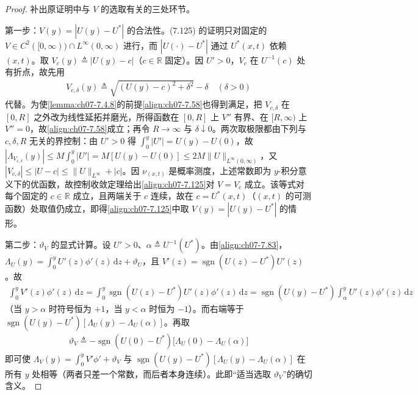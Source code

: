 \documentclass[../../main.tex]{subfiles}%
\begin{document}
\begin{proof}
补出原证明中与 $V$ 的选取有关的三处环节。

第一步：$V(y)=|U(y)-U^*|$ 的合法性。(7.125) 的证明只对固定的 $V\in C^2([0,\infty))\cap L^\infty(0,\infty)$ 进行，而 $|U(\cdot)-U^*|$ 通过 $U^*(x,t)$ 依赖 $(x,t)$。取 $V_c(y)\triangleq|U(y)-c|$（$c\in\mathbb{R}$ 固定）。因 $U'>0$，$V_c$ 在 $U^{-1}(c)$ 处有折点，故先用
\begin{align*}
V_{c,\delta}(y)\triangleq\sqrt{(U(y)-c)^2+\delta^2}-\delta\quad(\delta>0)
\end{align*}
代替。为使\cref{lemma:ch07-7.4.8}的前提\eqref{align:ch07-7.58}也得到满足，把 $V_{c,\delta}$ 在 $[0,R]$ 之外改为线性延拓并磨光，所得函数在 $[0,R]$ 上 $V''$ 有界、在 $[R,\infty)$ 上 $V''=0$，故\eqref{align:ch07-7.58}成立；再令 $R\to\infty$ 与 $\delta\downarrow0$。两次取极限都由下列与 $c,\delta,R$ 无关的界控制：由 $U'>0$ 得 $\int_0^y|U'|=U(y)-U(0)$，故 $|\Lambda_{V_{c,\delta}}(y)|\leqslant M\int_0^y|U'|=M[U(y)-U(0)]\leqslant2M\|U\|_{L^\infty(0,\infty)}$，又 $|V_{c,\delta}|\leqslant|U-c|\leqslant\|U\|_{L^\infty}+|c|$。因 $\nu_{(x,t)}$ 是概率测度，上述常数即为 $y$-积分意义下的优函数，故控制收敛定理给出\eqref{align:ch07-7.125}对 $V=V_c$ 成立。该等式对每个固定的 $c\in\mathbb{R}$ 成立，且两端关于 $c$ 连续，故在 $c=U^*(x,t)$（$(x,t)$ 的可测函数）处取值仍成立，即得\eqref{align:ch07-7.125}中取 $V(y)=|U(y)-U^*|$ 的情形。

第二步：$\vartheta_V$ 的显式计算。设 $U'>0$、$\alpha\triangleq U^{-1}(U^*)$。由\eqref{align:ch07-7.83}，$\Lambda_U(y)=\int_0^yU'(z)\phi'(z)\,\mathrm{d}z+\vartheta_U$，且 $V'(z)=\operatorname{sgn}(U(z)-U^*)U'(z)$。故
\begin{align*}
\int_0^yV'(z)\phi'(z)\,\mathrm{d}z=\int_0^y\operatorname{sgn}(U(z)-U^*)U'(z)\phi'(z)\,\mathrm{d}z
=\operatorname{sgn}(U(y)-U^*)\int_\alpha^yU'(z)\phi'(z)\,\mathrm{d}z
\end{align*}
（当 $y>\alpha$ 时符号恒为 $+1$，当 $y<\alpha$ 时恒为 $-1$）。而右端等于 $\operatorname{sgn}(U(y)-U^*)[\Lambda_U(y)-\Lambda_U(\alpha)]$。再取
\begin{align*}
\vartheta_V\triangleq-\operatorname{sgn}(U(0)-U^*)\big[\Lambda_U(0)-\Lambda_U(\alpha)\big]
\end{align*}
即可使 $\Lambda_V(y)=\int_0^yV'\phi'+\vartheta_V$ 与 $\operatorname{sgn}(U(y)-U^*)[\Lambda_U(y)-\Lambda_U(\alpha)]$ 在所有 $y$ 处相等（两者只差一个常数，而后者本身连续）。此即“适当选取 $\vartheta_V$”的确切含义。


\end{proof}
\end{document}
